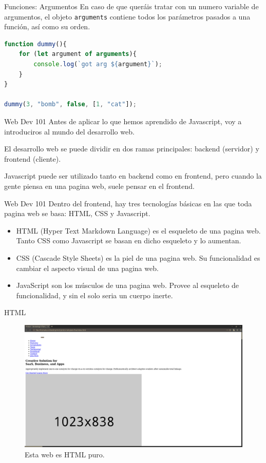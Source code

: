 \documentclass{beamer}
\begin{document}
\begin{frame}[fragile]{Funciones: Argumentos}
En caso de que queráis tratar con un numero variable de argumentos, el objeto {\verb|arguments|} contiene todos los parámetros pasados a una función, así como su orden.

\begin{lstlisting}[language=JavaScript]
function dummy(){
    for (let argument of arguments){
        console.log(`got arg ${argument}`);
    }
}

dummy(3, "bomb", false, [1, "cat"]);
\end{lstlisting}
\end{frame}

\begin{frame}{Web Dev 101}
Antes de aplicar lo que hemos aprendido de Javascript, voy a introduciros al mundo del desarrollo web.

El desarrollo web se puede dividir en dos ramas principales: backend (servidor) y frontend (cliente).

Javascript puede ser utilizado tanto en backend como en frontend, pero cuando la gente piensa en una pagina web, suele pensar en el frontend.
    
\end{frame}

\begin{frame}{Web Dev 101}
Dentro del frontend, hay tres tecnologías básicas en las que toda pagina web se basa: HTML, CSS y Javascript.
\begin{itemize}
    \item HTML (Hyper Text Markdown Language) es el esqueleto de una pagina web. Tanto CSS como Javascript se basan en dicho esqueleto y lo aumentan.
    \item CSS (Cascade Style Sheets) es la piel de una pagina web. Su funcionalidad es cambiar el aspecto visual de una pagina web.
    \item JavaScript son los músculos de una pagina web. Provee al esqueleto de funcionalidad, y sin el solo seria un cuerpo inerte.
\end{itemize}
\end{frame}

\begin{frame}{HTML}
\begin{figure}
    \centering
    \includegraphics[width=\textwidth]{images/nocss.png}
    \caption{Esta web es HTML puro.}
\end{figure}
\end{frame}
\end{document}
